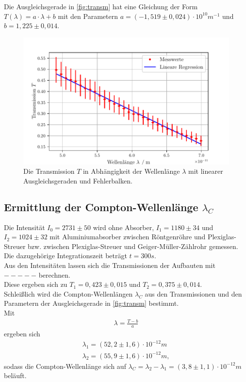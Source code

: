 Die Ausgleichsgerade in \autoref{fig:transm} hat eine Gleichung der Form $T(\lambda) = a \cdot \lambda + b$ mit 
den Parametern $a = (-1,519 \pm 0,024)\cdot 10^{10} m^{-1}$ und $b = 1,225 \pm 0,014$.

\begin{figure}
  \centering
  \includegraphics{build/transmission2.pdf}
  \caption{Die Transmission $T$ in Abhängigkeit der Wellenlänge $\lambda$ mit linearer Ausgleichsgeraden und Fehlerbalken.}
  \label{fig:transm2}
\end{figure}



\subsection{Ermittlung der Compton-Wellenlänge $\lambda_{C}$}
\label{subsec:comptonwellenl}

Die Intensität $I_0 = 2731 \pm 50$ wird ohne Absorber, $I_1 = 1180 \pm 34$ und $I_2 = 1024 \pm 32$ mit Aluminiumabsorber zwischen Röntgenröhre
und Plexiglas-Streuer bzw. zwischen Plexiglas-Streuer und Geiger-Müller-Zählrohr gemessen.\\
Die dazugehörige Integrationszeit beträgt $t = 300s$.\\

Aus den Intensitäten lassen sich die Transmissionen der Aufbauten mit $-----$ berechnen. \\
Diese ergeben sich zu $T_1 = 0,423 \pm 0,015$ und $T_2 = 0,375 \pm 0,014$.\\

Schleißlich wird die Compton-Wellenlängen $\lambda_C$ aus den Transmissionen und den Parametern der Ausgleichsgerade 
in \autoref{fig:transm} bestimmt. \\
Mit 
\begin{align*}
  \lambda = \frac{T-b}{a}
\end{align*}
ergeben sich
\begin{align*}
  \lambda_1 = (52,2 \pm 1,6) \cdot 10^{-12}m \\
  \lambda_2 = (55,9 \pm 1,6) \cdot 10^{-12}m,
\end{align*}
sodass die Compton-Wellenlänge sich auf $\lambda_C = \lambda_2 - \lambda_1 = (3,8 \pm 1,1) \cdot 10^{-12}m$ beläuft.\\